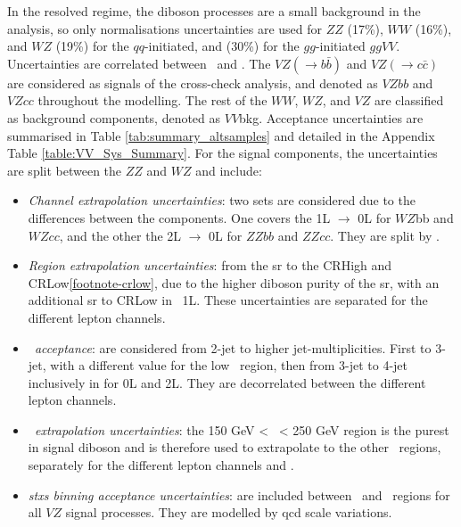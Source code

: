 In the resolved regime, the diboson processes are a small background in the analysis, so only normalisations uncertainties are used for $ZZ$ (17\%), $WW$ (16\%), and $WZ$ (19\%) for the $qq$-initiated, and (30\%) for the $gg$-initiated $ggVV$. Uncertainties are correlated between \vhb\ and \vhc. The $VZ (\rightarrow b\bar{b})$ and $VZ (\rightarrow c\bar{c})$ are considered as signals of the cross-check analysis, and denoted as $VZbb$ and $VZcc$ throughout the modelling. The rest of the $WW$, $WZ$, and $VZ$ are classified as background components, denoted as $VV$bkg. Acceptance uncertainties are summarised in Table \ref{tab:summary_altsamples} and detailed in the Appendix Table \ref{table:VV_Sys_Summary}. For the signal components, the uncertainties are split between the $ZZ$ and $WZ$ and include:
\begin{itemize}[leftmargin=*]
    \item \textit{Channel extrapolation uncertainties}: two sets are considered due to the differences between the components. One covers the 1L $\rightarrow$ 0L for $WZ$bb and $WZcc$, and the other the 2L $\rightarrow$ 0L for $ZZbb$ and $ZZcc$. They are split by \nj.
    \item \textit{Region extrapolation uncertainties}: from the \gls{sr} to the CRHigh and CRLow\cref{footnote-crlow}, due to the higher diboson purity of the \gls{sr}, with an additional \gls{sr} to CRLow in \vhb\ 1L. These uncertainties are separated for the different lepton channels.
    \item \textit{\nj\ acceptance}: are considered from 2-jet to higher jet-multiplicities. First to 3-jet, with a different value for the low \ptv\ region, then from 3-jet to 4-jet inclusively in \ptv for 0L and 2L. They are decorrelated between the different lepton channels.
    \item \textit{\ptv\ extrapolation uncertainties}: the 150 GeV < \ptv\ < 250 GeV region is the purest in signal diboson and is therefore used to extrapolate to the other \ptv\ regions, separately for the different lepton channels and \nj.
    \item \textit{\gls{stxs} binning acceptance uncertainties}: are included between \nj\ and \ptv\ regions for all $VZ$ signal processes. They are modelled by \gls{qcd} scale variations. 
\end{itemize}

